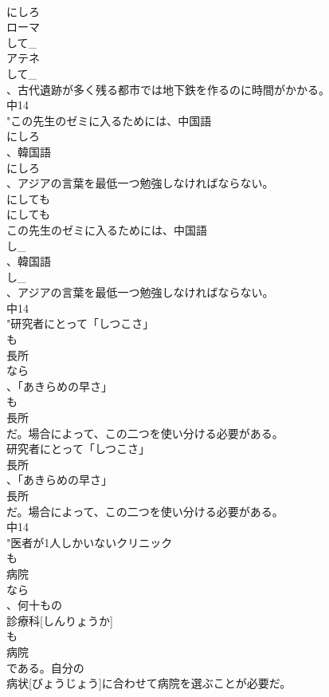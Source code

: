 \documentclass[8pt]{extreport}
\begin{document}
\begin{CJK}{UTF8}{min}
\\	にしろ
\\	ローマ
\\	して_
\\	アテネ
\\	して_
\\	、古代遺跡が多く残る都市では地下鉄を作るのに時間がかかる。
\\	中14
\\	"この先生のゼミに入るためには、中国語
\\	にしろ
\\	、韓国語
\\	にしろ
\\	、アジアの言葉を最低一つ勉強しなければならない。
\\	にしても
\\	にしても
\\	この先生のゼミに入るためには、中国語
\\	し_
\\	、韓国語
\\	し_
\\	、アジアの言葉を最低一つ勉強しなければならない。
\\	中14
\\	"研究者にとって「しつこさ」
\\	も
\\	長所
\\	なら
\\	、「あきらめの早さ」
\\	も
\\	長所
\\	だ。場合によって、この二つを使い分ける必要がある。
\\	研究者にとって「しつこさ」
\\	長所
\\	、「あきらめの早さ」
\\	長所
\\	だ。場合によって、この二つを使い分ける必要がある。
\\	中14
\\	"医者が1人しかいないクリニック
\\	も
\\	病院
\\	なら
\\	、何十もの
\\	診療科[しんりょうか]
\\	も
\\	病院
\\	である。自分の
\\	病状[びょうじょう]に合わせて病院を選ぶことが必要だ。

\end{CJK}
\end{document}
